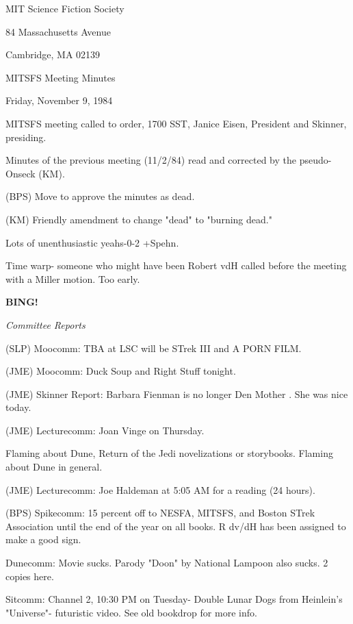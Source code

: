 \documentclass[12pt]{article}
\newcommand{\bing}{{\bf BING!} }
\newcommand{\goto}[1]{\bing \vskip 12pt \centerline{{\em{#1}}}}
\begin{document}
\begin{center}

MIT Science Fiction Society 

84 Massachusetts Avenue

Cambridge, MA 02139

\vspace{12pt}

MITSFS Meeting Minutes 

Friday, November 9, 1984

\end{center}
 
\vspace{18pt}

\setlength{\parskip}{6pt}

\noindent
MITSFS meeting called to order, 1700 SST,
Janice Eisen, President and Skinner, presiding.

Minutes of the previous meeting (11/2/84) read and corrected by the pseudo-Onseck (KM).

(BPS) Move to approve the minutes as dead.

(KM) Friendly amendment to change "dead" to "burning dead."

Lots of unenthusiastic yeahs-0-2 +Spehn.

Time warp- someone who might have been Robert vdH called before the meeting with a Miller motion. Too early.

\goto{Committee Reports}

(SLP) Moocomm: TBA at LSC will be STrek III and A PORN FILM.

(JME) Moocomm: Duck Soup and Right Stuff tonight.

(JME) Skinner Report: Barbara Fienman is no longer Den Mother      . She was nice today.

(JME) Lecturecomm: Joan Vinge on Thursday.

Flaming about Dune, Return of the Jedi novelizations or storybooks. Flaming about Dune in general.

(JME) Lecturecomm: Joe Haldeman at 5:05 AM for a reading (24 hours).

(BPS) Spikecomm: 15 percent off to NESFA, MITSFS, and Boston STrek Association until the end of the year on all books. R dv/dH has been assigned to make a good sign.

Dunecomm: Movie sucks. Parody "Doon" by National Lampoon also sucks. 2 copies here.

Sitcomm: Channel 2, 10:30 PM on Tuesday- Double Lunar Dogs from Heinlein's "Universe"- futuristic video. See old bookdrop for more info.
\end{document}

